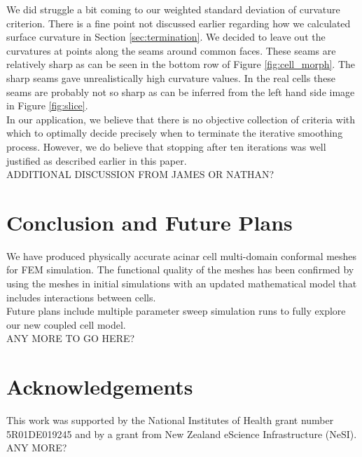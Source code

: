 \documentclass[a4paper,10pt]{article}
\begin{document}
We did struggle a bit coming to our weighted standard deviation of curvature criterion. There is a fine point not discussed earlier regarding how we calculated surface curvature in Section \ref{sec:termination}. We decided to leave out the curvatures at points along the seams around common faces. These seams are relatively sharp as can be seen in the bottom row of Figure \ref{fig:cell_morph}. The sharp seams gave unrealistically high curvature values. In the real cells these seams are probably not so sharp as can be inferred from the left hand side image in Figure \ref{fig:slice}.\\

In our application, we believe that there is no objective collection of criteria with which to optimally decide precisely when to terminate the iterative smoothing process. However, we do believe that stopping after ten iterations was well justified as described earlier in this paper.\\

ADDITIONAL DISCUSSION FROM JAMES OR NATHAN?\\

\section{Conclusion and Future Plans}

We have produced physically accurate acinar cell multi-domain conformal meshes for FEM simulation. The functional quality of the meshes has been confirmed by using the meshes in initial simulations with an updated mathematical model that includes interactions between cells.\\

Future plans include multiple parameter sweep simulation runs to fully explore our new coupled cell model.\\
ANY MORE TO GO HERE?\\

\section{Acknowledgements}
This work was supported by the National Institutes of Health grant number 5R01DE019245 and by a grant from New Zealand eScience Infrastructure (NeSI).\\
ANY MORE?\\




\pagebreak
\appendix
\end{document}
